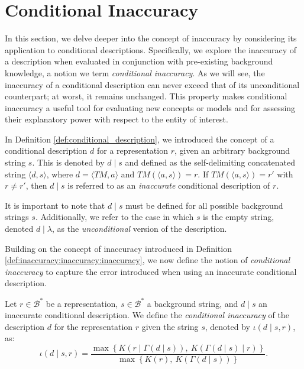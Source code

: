 %
%

\section{Conditional Inaccuracy}
\label{sec:conditional_inaccuracy}

In this section, we delve deeper into the concept of inaccuracy by considering its application to conditional descriptions. Specifically, we explore the inaccuracy of a description when evaluated in conjunction with pre-existing background knowledge, a notion we term \emph{conditional inaccuracy}. As we will see, the inaccuracy of a conditional description can never exceed that of its unconditional counterpart; at worst, it remains unchanged. This property makes conditional inaccuracy a useful tool for evaluating new concepts or models and for assessing their explanatory power with respect to the entity of interest.

In Definition \ref{def:conditional_description}, we introduced the concept of a conditional description \(d\) for a representation \(r\), given an arbitrary background string \(s\). This is denoted by \(d \mid s\) and defined as the self-delimiting concatenated string \(\langle d, s \rangle\), where \(d = \langle TM, a \rangle\) and \(TM(\langle a, s \rangle) = r\). If \(TM(\langle a, s \rangle) = r'\) with \(r \neq r'\), then \(d \mid s\) is referred to as an \emph{inaccurate} conditional description of \(r\).

It is important to note that \(d \mid s\) must be defined for all possible background strings \(s\). Additionally, we refer to the case in which \(s\) is the empty string, denoted \(d \mid \lambda\), as the \emph{unconditional} version of the description.

Building on the concept of inaccuracy introduced in Definition \ref{def:inaccuracy:inaccuracy:inaccuracy}, we now define the notion of \emph{conditional inaccuracy} to capture the error introduced when using an inaccurate conditional description.

\begin{definition}
Let \(r \in \mathcal{B}^\ast\) be a representation, \(s \in \mathcal{B}^\ast\) a background string, and \(d \mid s\) an inaccurate conditional description. We define the \emph{conditional inaccuracy} of the description \(d\) for the representation \(r\) given the string \(s\), denoted by \(\iota(d \mid s, r)\), as:
\[
\iota(d \mid s, r) = \frac{ \max\left\{ K \left(r \mid \Gamma(d \mid s) \right),\ K \left( \Gamma(d \mid s) \mid r \right) \right\} }{ \max\left\{ K(r),\ K \left( \Gamma(d \mid s) \right) \right\} }.
\]
\end{definition}


